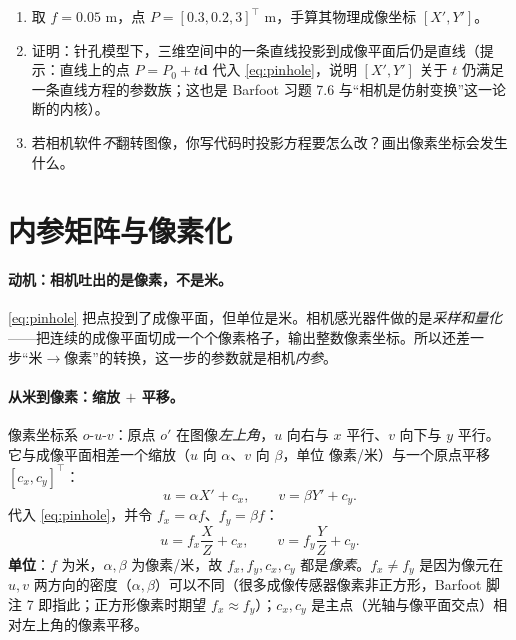 \begin{practice}
\begin{enumerate}
  \item 取 $f=0.05$ m，点 $P=[0.3,0.2,3]^\top$ m，手算其物理成像坐标 $[X',Y']$。
  \item 证明：针孔模型下，三维空间中的一条直线投影到成像平面后仍是直线（提示：直线上的点 $P=P_0+t\mathbf{d}$ 代入 \cref{eq:pinhole}，说明 $[X',Y']$ 关于 $t$ 仍满足一条直线方程的参数族；这也是 Barfoot 习题 7.6\cite{barfoot2024state} 与“相机是仿射变换”这一论断的内核）。
  \item 若相机软件\emph{不}翻转图像，你写代码时投影方程要怎么改？画出像素坐标会发生什么。
\end{enumerate}
\end{practice}

\section{内参矩阵与像素化}
\label{sec:cam-intrinsics}

\paragraph{动机：相机吐出的是像素，不是米。}
\cref{eq:pinhole} 把点投到了成像平面，但单位是米。相机感光器件做的是\emph{采样和量化}——把连续的成像平面切成一个个像素格子，输出整数像素坐标\cite{gaoxiang2019slam14}。所以还差一步“米$\to$像素”的转换，这一步的参数就是相机\emph{内参}。

\paragraph{从米到像素：缩放 $+$ 平移。}
像素坐标系 $o\text{-}u\text{-}v$：原点 $o'$ 在图像\emph{左上角}，$u$ 向右与 $x$ 平行、$v$ 向下与 $y$ 平行。它与成像平面相差一个缩放（$u$ 向 $\alpha$、$v$ 向 $\beta$，单位 像素/米）与一个原点平移 $[c_x,c_y]^\top$：
\begin{equation}
  u=\alpha X'+c_x,\qquad v=\beta Y'+c_y.
  \label{eq:pixelize}
\end{equation}
代入 \cref{eq:pinhole}，并令 $f_x=\alpha f$、$f_y=\beta f$：
\begin{equation}
  u=f_x\frac{X}{Z}+c_x,\qquad v=f_y\frac{Y}{Z}+c_y.
  \label{eq:intrinsic-scalar}
\end{equation}
\textbf{单位}：$f$ 为米，$\alpha,\beta$ 为像素/米，故 $f_x,f_y,c_x,c_y$ 都是\emph{像素}。$f_x\ne f_y$ 是因为像元在 $u,v$ 两方向的密度（$\alpha,\beta$）可以不同（很多成像传感器像素非正方形，Barfoot 脚注 7\cite{barfoot2024state} 即指此；正方形像素时期望 $f_x\approx f_y$\cite{carlone2026handbook}）；$c_x,c_y$ 是主点（光轴与像平面交点）相对左上角的像素平移。

